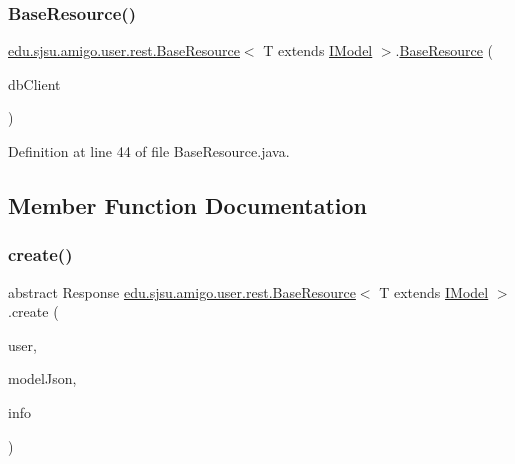 \subsubsection{\texorpdfstring{Base\+Resource()}{BaseResource()}}
{\footnotesize\ttfamily \hyperlink{classedu_1_1sjsu_1_1amigo_1_1user_1_1rest_1_1_base_resource}{edu.\+sjsu.\+amigo.\+user.\+rest.\+Base\+Resource}$<$ T extends \hyperlink{interfaceedu_1_1sjsu_1_1amigo_1_1db_1_1common_1_1model_1_1_i_model}{I\+Model} $>$.\hyperlink{classedu_1_1sjsu_1_1amigo_1_1user_1_1rest_1_1_base_resource}{Base\+Resource} (\begin{DoxyParamCaption}\item[{\hyperlink{interfaceedu_1_1sjsu_1_1amigo_1_1db_1_1common_1_1_d_b_client}{D\+B\+Client}}]{db\+Client }\end{DoxyParamCaption})}



Definition at line 44 of file Base\+Resource.\+java.



\subsection{Member Function Documentation}
\mbox{\label{classedu_1_1sjsu_1_1amigo_1_1user_1_1rest_1_1_base_resource_a708bf0430236ca3a84a79784a8dcbed4}} 
\subsubsection{\texorpdfstring{create()}{create()}}
{\footnotesize\ttfamily abstract Response \hyperlink{classedu_1_1sjsu_1_1amigo_1_1user_1_1rest_1_1_base_resource}{edu.\+sjsu.\+amigo.\+user.\+rest.\+Base\+Resource}$<$ T extends \hyperlink{interfaceedu_1_1sjsu_1_1amigo_1_1db_1_1common_1_1model_1_1_i_model}{I\+Model} $>$.create (\begin{DoxyParamCaption}\item[{@Auth \hyperlink{classedu_1_1sjsu_1_1amigo_1_1user_1_1auth_1_1_principal_user}{Principal\+User}}]{user,  }\item[{@Valid String}]{model\+Json,  }\item[{@Context Uri\+Info}]{info }\end{DoxyParamCaption})\hspace{0.3cm}{\ttfamily [abstract]}}

